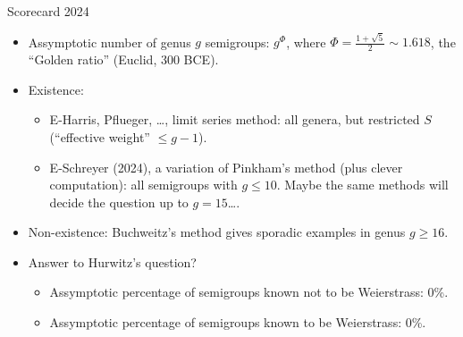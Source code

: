 \documentclass[11pt, aspectratio=43]{beamer}
\begin{document}
\begin{frame}{Scorecard 2024}\
\begin{itemize}
\item<1-> Assymptotic number of genus $g$ semigroups: $g^\Phi$, where $\Phi = \frac{1+\sqrt 5}{2}\sim 1.618$, the ``Golden ratio'' (Euclid, 300 BCE).
 \item<2-> Existence: 
\begin{itemize}
  \item<3-> E-Harris, Pflueger, \dots, limit series method: all genera, but restricted $S$ (``effective weight'' $\leq g-1$).
\item<3-> E-Schreyer (2024), a variation of Pinkham's method (plus clever computation): all semigroups with $g\leq 10$. Maybe the same methods will decide the question up to $g =15$\dots .
\end{itemize}
\item<4-> Non-existence: Buchweitz's method gives sporadic examples in genus $g \geq 16$.
\item<5-> Answer to Hurwitz's question?
\begin{itemize}
  \item<6-> \alert{Assymptotic percentage of semigroups  known not to be Weierstrass: 0\%.}
 \item<6-> \alert{Assymptotic percentage of semigroups  known to be Weierstrass: 0\%.}
\end{itemize}
 \end{itemize}
\end{frame}
\end{document}
